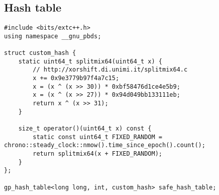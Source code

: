 \documentclass[landscape, 8pt, a4paper, oneside]{extarticle}
\begin{document}
\begin{multicols}{3}
\begin{itemize}
 \end{itemize}

\subsection{Hash table}
\begin{verbatim}
#include <bits/extc++.h> 
using namespace __gnu_pbds;

struct custom_hash {
    static uint64_t splitmix64(uint64_t x) {
        // http://xorshift.di.unimi.it/splitmix64.c
        x += 0x9e3779b97f4a7c15;
        x = (x ^ (x >> 30)) * 0xbf58476d1ce4e5b9;
        x = (x ^ (x >> 27)) * 0x94d049bb133111eb;
        return x ^ (x >> 31);
    }

    size_t operator()(uint64_t x) const {
        static const uint64_t FIXED_RANDOM = chrono::steady_clock::nmow().time_since_epoch().count();
        return splitmix64(x + FIXED_RANDOM);
    }
};

gp_hash_table<long long, int, custom_hash> safe_hash_table;
\end{verbatim}
 

\end{multicols}
\end{document}
